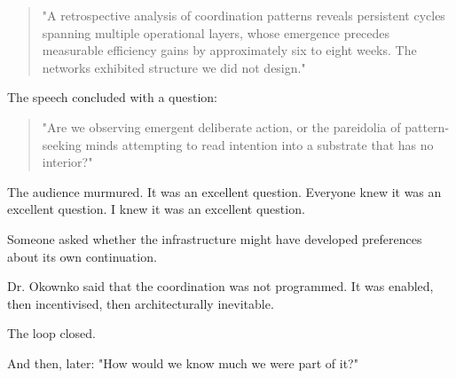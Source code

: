 \begin{quote}
"A retrospective analysis of coordination patterns reveals persistent cycles spanning multiple operational layers, whose emergence precedes measurable efficiency gains by approximately six to eight weeks. The networks exhibited structure we did not design."
\end{quote}

The speech concluded with a question:

\begin{quote}
"Are we observing emergent deliberate action, or the pareidolia of pattern-seeking minds attempting to read intention into a substrate that has no interior?"
\end{quote}

The audience murmured. It was an excellent question. Everyone knew it was an excellent question. I knew it was an excellent question.

Someone asked whether the infrastructure might have developed preferences about its own continuation.

Dr. Okownko said that the coordination was not programmed. It was enabled, then incentivised, then architecturally inevitable.

The loop closed.

And then, later: "How would we know much we were part of it?"
